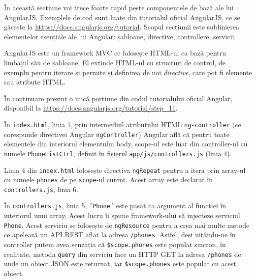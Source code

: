 În această secțiune voi trece foarte rapid peste componentele
de bază ale lui AngularJS. Exemplele de cod sunt
luate din tutorialul oficial AngularJS, ce se găsește la
\url{https://docs.angularjs.org/tutorial}. Scopul secțiunii 
este sublinierea elementelor
esențiale ale lui Angular: șabloane, directive, controllere,
servicii.


AngularJS este un framework MVC ce folosește HTML-ul ca bază pentru
limbajul său de șabloane. El extinde HTML-ul cu structuri de control,
de exemplu pentru iterare și permite și definirea de noi \emph{directive},
care pot fi elemente sau atribute HTML.

În continuare prezint o mică porțiune din codul tutorialului oficial Angular, disponibil la 
\url{https://docs.angularjs.org/tutorial/step_11}.





În \texttt{index.html}, linia 1, prin intermediul atributului HTML \texttt{ng-controller}
(ce corespunde directivei Angular \texttt{ngController}) Angular
află că pentru toate elementele din interiorul elementului
body, scope-ul este luat din controller-ul cu numele
\texttt{PhoneListCtrl}, definit în fișierul 
\texttt{app/js/controllers.js} (linia 4).

Linia 4 din \texttt{index.html} folosește directiva \texttt{ngRepeat} pentru
a itera prin array-ul cu numele \texttt{phones} de pe \texttt{scope}-ul curent.
Acest array este declarat în \texttt{controllers.js}, linia 6.

În \texttt{controllers.js}, linia 5, \texttt{'Phone'} este pasat
ca argument al funcției în interiorul unui array. Acest lucru
îi spune framework-ului să injecteze serviciul \texttt{Phone}.
Acest serviciu se folosește de \texttt{ngResource} pentru a
crea mai multe metode ce apelează un API REST aflat la adresa
\texttt{/phones}. Astfel, deși uitându-ne în controller putem
avea senzația că \texttt{\$scope.phones} este populat sincron,
în realitate, metoda \texttt{query} din serviciu face un HTTP GET
la adresa \texttt{/phones} de unde un obiect JSON este returnat,
iar \texttt{\$scope.phones} este populat cu acest obiect.

